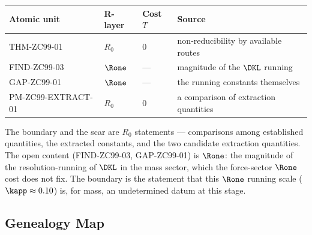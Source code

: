 \documentclass[12pt, a4paper]{article}
\begin{document}
\begin{layerbox}[title={R-Layer Assignments for ZC99 (v2)}]
{\small\renewcommand{\arraystretch}{1.25}
\begin{center}
\begin{tabular}{@{}llll@{}}
\toprule
Atomic unit & R-layer & Cost $T$ & Source \\
\midrule
THM-ZC99-01        & $R_0$ & $0$ & non-reducibility by available routes \\
FIND-ZC99-03       & $\Rone$ & --- & magnitude of the $\DKL$ running \\
GAP-ZC99-01        & $\Rone$ & --- & the running constants themselves \\
PM-ZC99-EXTRACT-01 & $R_0$ & $0$ & a comparison of extraction quantities \\
\bottomrule
\end{tabular}
\end{center}}
The boundary and the scar are $R_0$ statements --- comparisons among established
quantities, the extracted constants, and the two candidate extraction
quantities. The open content (FIND-ZC99-03, GAP-ZC99-01) is $\Rone$: the
magnitude of the resolution-running of $\DKL$ in the mass sector, which the
force-sector $\Rone$ cost does not fix. The boundary is the statement that this
$\Rone$ running scale ($\kapp\approx0.10$) is, for mass, an undetermined datum at
this stage.
\end{layerbox}

\subsection{Genealogy Map}
\label{sec:genealogy-zc99}
\end{document}
